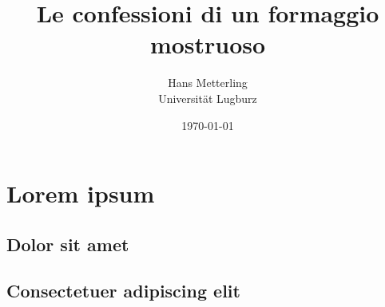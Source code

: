\documentclass[a4paper,12pt]{article}
\title{Le confessioni di un formaggio mostruoso}
\author{Hans Metterling\\ Universit\"at Lugburz}
\date{\today}
\begin{document}
\maketitle

\tableofcontents %


\section{Lorem ipsum}
\lipsum[1]

\subsection{Dolor sit amet}
\lipsum[1]

\subsection{Consectetuer adipiscing elit}
\lipsum[1]
\end{document}
